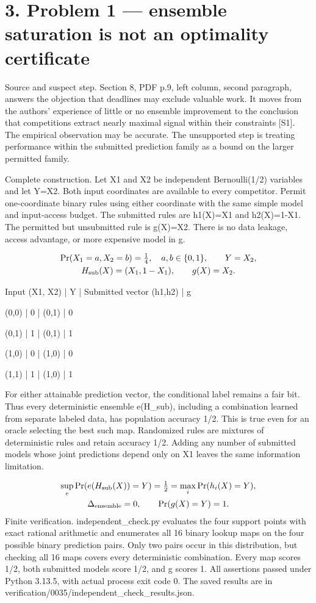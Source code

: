 \documentclass[10pt]{article}
\begin{document}
\section*{3. Problem 1 — ensemble saturation is not an optimality certificate}
Source and suspect step. Section 8, PDF p.9, left column, second paragraph, answers the objection that deadlines may exclude valuable work. It moves from the authors’ experience of little or no ensemble improvement to the conclusion that competitions extract nearly maximal signal within their constraints [S1]. The empirical observation may be accurate. The unsupported step is treating performance within the submitted prediction family as a bound on the larger permitted family.\par
Complete construction. Let X1 and X2 be independent Bernoulli(1/2) variables and let Y=X2. Both input coordinates are available to every competitor. Permit one-coordinate binary rules using either coordinate with the same simple model and input-access budget. The submitted rules are h1(X)=X1 and h2(X)=1-X1. The permitted but unsubmitted rule is g(X)=X2. There is no data leakage, access advantage, or more expensive model in g.\par
\[\begin{gathered}\Pr(X_1=a,X_2=b)=\tfrac14,\quad a,b\in\{0,1\},\qquad Y=X_2,\\ H_{\rm sub}(X)=(X_1,1-X_1),\qquad g(X)=X_2.\end{gathered}\]\par
Input (X1, X2) | Y | Submitted vector (h1,h2) | g\par
(0,0) | 0 | (0,1) | 0\par
(0,1) | 1 | (0,1) | 1\par
(1,0) | 0 | (1,0) | 0\par
(1,1) | 1 | (1,0) | 1\par
For either attainable prediction vector, the conditional label remains a fair bit. Thus every deterministic ensemble e(H\_sub), including a combination learned from separate labeled data, has population accuracy 1/2. This is true even for an oracle selecting the best such map. Randomized rules are mixtures of deterministic rules and retain accuracy 1/2. Adding any number of submitted models whose joint predictions depend only on X1 leaves the same information limitation.\par
\[\begin{gathered}\sup_e \Pr(e(H_{\rm sub}(X))=Y)=\tfrac12=\max_i\Pr(h_i(X)=Y),\\ \Delta_{\rm ensemble}=0,\qquad \Pr(g(X)=Y)=1.\end{gathered}\] Finite verification. independent\_check.py evaluates the four support points with exact rational arithmetic and enumerates all 16 binary lookup maps on the four possible binary prediction pairs. Only two pairs occur in this distribution, but checking all 16 maps covers every deterministic combination. Every map scores 1/2, both submitted models score 1/2, and g scores 1. All assertions passed under Python 3.13.5, with actual process exit code 0. The saved results are in verification/0035/independent\_check\_results.json.\par
\end{document}
